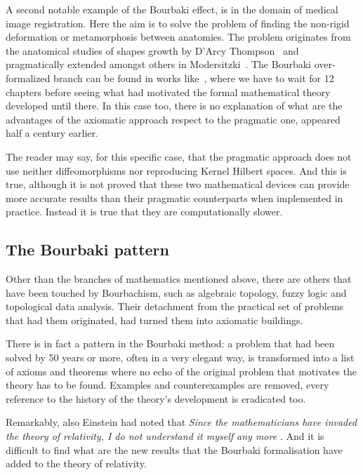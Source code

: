 \documentclass[]{scrartcl}
\theoremstyle{definition}
\begin{document}
A second notable example of the Bourbaki effect, is in the domain of medical image registration. Here the aim is to solve the problem of finding the non-rigid deformation or metamorphosis between anatomies. The problem originates from the anatomical studies of shapes growth by D'Arcy Thompson~\cite{d1942growth} and pragmatically extended amongst others in Modersitzki~\cite{modersitzki2004numerical}. The Bourbaki over-formalized branch can be found in works like~\cite{younes2010shapes}, where we have to wait for 12 chapters before seeing what had motivated the formal mathematical theory developed until there. 
In this case too, there is no explanation of what are the advantages of the axiomatic approach respect to the pragmatic one, appeared half a century earlier.

The reader may say, for this specific case, that the pragmatic approach \cite{modersitzki2004numerical} does not use neither diffeomorphisms nor reproducing Kernel Hilbert spaces. And this is true, although it is not proved that these two mathematical devices can provide more accurate results than their pragmatic counterparts when implemented in practice. Instead it is true that they are computationally slower.


\subsection*{The Bourbaki pattern}

Other than the branches of mathematics mentioned above, there are others that have been touched by Bourbachism, such as algebraic topology, fuzzy logic and topological data analysis. Their detachment from the practical set of problems that had them originated, had turned them into axiomatic buildings.

There is in fact a pattern in the Bourbaki method: a problem that had been solved by 50 years or more, often in a very elegant way, is transformed into a list of axioms and theorems where no echo of the original problem that motivates the theory has to be found. Examples and counterexamples are removed, every reference to the history of the theory's development is eradicated too.

Remarkably, also Einstein had noted that \emph{Since the mathematicians have invaded the theory of relativity, I do not understand it myself any more} \cite{schilpp1951albert}. And it is difficult to find what are the new results that the Bourbaki formalisation have added to the theory of relativity.
\end{document}
